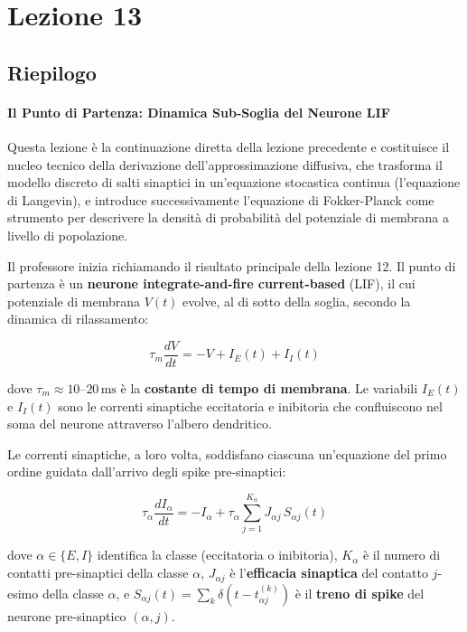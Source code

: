 \chapter{Lezione 13}


\section{Riepilogo}

\subsubsection{Il Punto di Partenza: Dinamica Sub-Soglia del Neurone LIF}

Questa lezione è la continuazione diretta della lezione precedente e costituisce il nucleo tecnico della derivazione dell'approssimazione diffusiva, che trasforma il modello discreto di salti sinaptici in un'equazione stocastica continua (l'equazione di Langevin), e introduce successivamente l'equazione di Fokker-Planck come strumento per descrivere la densità di probabilità del potenziale di membrana a livello di popolazione.

Il professore inizia richiamando il risultato principale della lezione 12. Il punto di partenza è un \textbf{neurone integrate-and-fire current-based} (LIF), il cui potenziale di membrana $V(t)$ evolve, al di sotto della soglia, secondo la dinamica di rilassamento:

\begin{equation}
\tau_m \frac{dV}{dt} = -V + I_E(t) + I_I(t)
\end{equation}

dove $\tau_m \approx 10$–$20\,\text{ms}$ è la \textbf{costante di tempo di membrana}. Le variabili $I_E(t)$ e $I_I(t)$ sono le correnti sinaptiche eccitatoria e inibitoria che confluiscono nel soma del neurone attraverso l'albero dendritico.

Le correnti sinaptiche, a loro volta, soddisfano ciascuna un'equazione del primo ordine guidata dall'arrivo degli spike pre-sinaptici:

\begin{equation}
\tau_\alpha \frac{dI_\alpha}{dt} = -I_\alpha + \tau_\alpha \sum_{j=1}^{K_\alpha} J_{\alpha j}\, S_{\alpha j}(t)
\end{equation}

dove $\alpha \in \{E, I\}$ identifica la classe (eccitatoria o inibitoria), $K_\alpha$ è il numero di contatti pre-sinaptici della classe $\alpha$, $J_{\alpha j}$ è l'\textbf{efficacia sinaptica} del contatto $j$-esimo della classe $\alpha$, e $S_{\alpha j}(t) = \sum_k \delta(t - t_{\alpha j}^{(k)})$ è il \textbf{treno di spike} del neurone pre-sinaptico $(\alpha, j)$.

